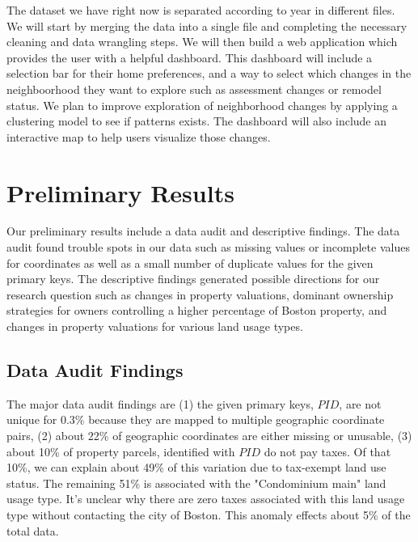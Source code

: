\documentclass[12pt]{article}
\begin{document}
The dataset we have right now is separated according to year in different
files. We will start by merging the data into a single file and completing
the necessary cleaning and data wrangling steps. We will then build a 
web application which provides the user with a helpful dashboard. This
dashboard will include a selection bar for their home preferences, and
a way to select which changes in the neighboorhood they want to
explore such as assessment changes or remodel status. We plan to improve
exploration of neighborhood changes by applying a clustering model to see
if patterns exists. The dashboard will also include an interactive map to
help users visualize those changes. 

\section*{Preliminary Results}

Our preliminary results include a data audit and descriptive findings.
The data audit found trouble spots in our data such as missing values or
incomplete values for coordinates as well as a small number of duplicate
values for the given primary keys. The descriptive findings generated
possible directions for our research question such as changes in 
property valuations, dominant ownership strategies for owners 
controlling a higher percentage of Boston property, and changes in
property valuations for various land usage types.

\subsection*{Data Audit Findings}

The major data audit findings are (1) the given primary keys, $PID$, are 
not unique for 0.3\% because they are mapped to multiple geographic 
coordinate pairs, (2) about 22\% of geographic coordinates are either 
missing or unusable, (3) about 10\% of property parcels, identified with
$PID$ do not pay taxes. Of that 10\%, we can explain about 49\% of this 
variation due to tax-exempt land use status. The remaining 51\% is 
associated with the "Condominium main" land usage type. It's unclear why 
there are zero taxes associated with this land usage type without 
contacting the city of Boston. This anomaly effects about 5\% of the 
total data.
\end{document}
